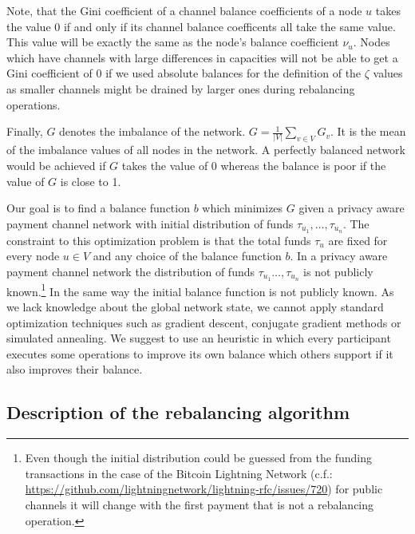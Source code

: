 \documentclass[a4paper]{paper}
\begin{document}
Note, that the Gini coefficient of a channel balance coefficients of a node $u$ takes the value $0$ if and only if its channel balance coefficents all take the same value.
This value will be exactly the same as the node's balance coefficient $\nu_u$.
Nodes which have channels with large differences in capacities will not be able to get a Gini coefficient of $0$ if we used absolute balances for the definition of the $\zeta$ values as smaller channels might be drained by larger ones during rebalancing operations.

Finally, $G$ denotes the imbalance of the network. $G = \displaystyle{\frac{1}{|V|}\sum_{v\in V}G_v}$. It is the mean of the imbalance values of all nodes in the network.
A perfectly balanced network would be achieved if $G$ takes the value of $0$ whereas the balance is poor if the value of $G$ is close to 1.

Our goal is to find a balance function $b$ which minimizes $G$ given a privacy aware payment channel network with initial distribution of funds $\tau_{u_1},\dots,\tau_{u_n}$.
The constraint to this optimization problem is that the total funds $\tau_u$ are fixed for every node $u \in V$ and any choice of the balance function $b$.
In a privacy aware payment channel network the distribution of funds $\tau_{u_1}\dots,\tau_{u_n}$ is not publicly known.\footnote{Even though the initial distribution could be guessed from the funding transactions in the case of the Bitcoin Lightning Network (c.f.: \url{https://github.com/lightningnetwork/lightning-rfc/issues/720}) for public channels it will change with the first payment that is not a rebalancing operation.}
In the same way the initial balance function is not publicly known.
As we lack knowledge about the global network state, we cannot apply standard optimization techniques such as gradient descent, conjugate gradient methods or simulated annealing.
We suggest to use an heuristic in which every participant executes some operations to improve its own balance which others support if it also improves their balance.

\subsection{Description of the rebalancing algorithm}
\label{sec:Algorithm}
\end{document}
